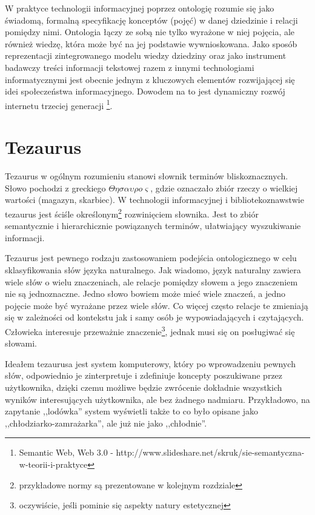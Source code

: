 \documentclass[12pt,a4paper,notitlepage]{article}
\begin{document}
W praktyce technologii informacyjnej poprzez ontologię rozumie się jako  świadomą, formalną 
specyfikację konceptów (pojęć) w danej dziedzinie i relacji pomiędzy nimi. Ontologia łączy ze sobą nie tylko wyrażone w niej pojęcia, ale również wiedzę, która może być na jej podstawie wywnioskowana. Jako sposób reprezentacji zintegrowanego  modelu wiedzy dziedziny oraz jako instrument badawczy treści informacji tekstowej razem z innymi technologiami informatycznymi jest obecnie jednym z kluczowych elementów 
rozwijającej się idei społeczeństwa informacyjnego. Dowodem na to jest dynamiczny rozwój internetu trzeciej generacji \footnote{Semantic Web, Web 3.0 - http://www.slideshare.net/skruk/sie-semantyczna-w-teorii-i-praktyce}. 
 
\section{Tezaurus}
Tezaurus w ogólnym rozumieniu stanowi słownik terminów bliskoznacznych. Słowo pochodzi z greckiego $\Theta \eta \sigma \alpha \upsilon \rho o \varsigma$, gdzie oznaczało zbiór rzeczy o wielkiej wartości (magazyn, skarbiec). W technologii informacyjnej i bibliotekoznawstwie tezaurus jest ściśle określonym\footnote{przykładowe normy są prezentowane w kolejnym rozdziale}  rozwinięciem słownika. Jest to zbiór semantycznie i hierarchicznie powiązanych terminów, ułatwiający wyszukiwanie informacji. 

Tezaurus jest pewnego rodzaju zastosowaniem podejścia ontologicznego w celu sklasyfikowania słów języka naturalnego. Jak wiadomo, język naturalny zawiera wiele słów o wielu znaczeniach, ale relacje pomiędzy słowem a jego znaczeniem nie są jednoznaczne. Jedno słowo bowiem może mieć wiele znaczeń, a jedno pojęcie może być wyrażane przez wiele słów. Co więcej często relacje te zmieniają się w zależności od kontekstu jak i samy osób je wypowiadających i czytających. Człowieka interesuje przeważnie znaczenie\footnote{oczywiście, jeśli pominie się aspekty natury estetycznej}, jednak musi się on posługiwać się słowami. 

Ideałem tezaurusa jest system komputerowy, który po wprowadzeniu pewnych słów, odpowiednio je zinterpretuje i zdefiniuje koncepty poszukiwane przez użytkownika, dzięki czemu możliwe będzie zwrócenie dokładnie wszystkich wyników interesujących użytkownika, ale bez żadnego nadmiaru. Przykładowo, na zapytanie ,,lodówka'' system wyświetli także to co było opisane jako ,,chłodziarko-zamrażarka'', ale już nie jako ,,chłodnie''. 
\end{document}
